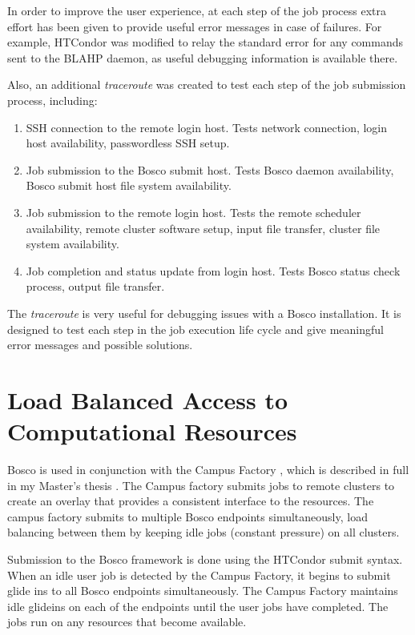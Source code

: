 In order to improve the user experience, at each step of the job process extra effort has been given to provide useful error messages in case of failures.  For example, HTCondor was modified to relay the standard error for any commands sent to the BLAHP daemon, as useful debugging information is available there.  

Also, an additional \emph{traceroute} was created to test each step of the job submission process, including:

\begin{enumerate}
\item SSH connection to the remote login host.  Tests network connection, login host availability, passwordless SSH setup.
\item Job submission to the Bosco submit host.  Tests Bosco daemon availability, Bosco submit host file system availability.
\item Job submission to the remote login host.  Tests the remote scheduler availability, remote cluster software setup, input file transfer, cluster file system availability.
\item Job completion and status update from login host.  Tests Bosco status check process, output file transfer.
\end{enumerate}

The \emph{traceroute} is very useful for debugging issues with a Bosco installation.  It is designed to test each step in the job execution life cycle and give meaningful error messages and possible solutions.

\section{Load Balanced Access to Computational Resources}

Bosco is used in conjunction with the Campus Factory \cite{website:campusfactory}, which is described in full in my Master's thesis \cite{weitzel2011campus}.  The Campus factory submits jobs to remote clusters to create an overlay that provides a consistent interface to the resources.  The campus factory submits to multiple Bosco endpoints simultaneously, load balancing between them by keeping idle jobs (constant pressure) on all clusters.

Submission to the Bosco framework is done using the HTCondor submit syntax.  When an idle user job is detected by the Campus Factory, it begins to submit glide ins to all Bosco endpoints simultaneously.  The Campus Factory maintains idle glideins on each of the endpoints until the user jobs have completed.  The jobs run on any resources that become available.


